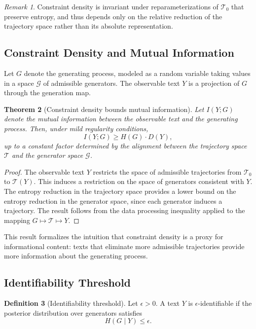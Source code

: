 \documentclass[12pt, oneside]{article}
\theoremstyle{plain}
\newtheorem{theorem}{Theorem}[section]
\theoremstyle{definition}
\newtheorem{definition}[theorem]{Definition}
\theoremstyle{remark}
\newtheorem{remark}[theorem]{Remark}
\begin{document}
\begin{remark}
Constraint density is invariant under reparameterizations of $\mathcal{T}_0$ that
preserve entropy, and thus depends only on the relative reduction of the trajectory
space rather than its absolute representation.
\end{remark}

\subsection{Constraint Density and Mutual Information}

Let $G$ denote the generating process, modeled as a random variable taking values
in a space $\mathcal{G}$ of admissible generators. The observable text $Y$ is a
projection of $G$ through the generation map.

\begin{theorem}[Constraint density bounds mutual information]
Let $I(Y; G)$ denote the mutual information between the observable text and the
generating process. Then, under mild regularity conditions,
\[
  I(Y; G) \geq H(G) \cdot D(Y),
\]
up to a constant factor determined by the alignment between the trajectory space
$\mathcal{T}$ and the generator space $\mathcal{G}$.
\end{theorem}

\begin{proof}
The observable text $Y$ restricts the space of admissible trajectories from
$\mathcal{T}_0$ to $\mathcal{T}(Y)$. This induces a restriction on the space of
generators consistent with $Y$. The entropy reduction in the trajectory space
provides a lower bound on the entropy reduction in the generator space, since
each generator induces a trajectory. The result follows from the data processing
inequality applied to the mapping $G \mapsto \mathcal{T} \mapsto Y$.
\end{proof}

This result formalizes the intuition that constraint density is a proxy for
informational content: texts that eliminate more admissible trajectories provide
more information about the generating process.

\subsection{Identifiability Threshold}

\begin{definition}[Identifiability threshold]
Let $\epsilon > 0$. A text $Y$ is $\epsilon$-identifiable if the posterior
distribution over generators satisfies
\[
  H(G \mid Y) \leq \epsilon.
\]
\end{definition}
\end{document}
